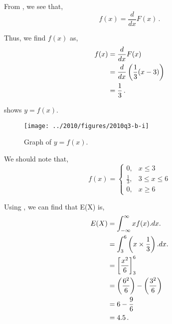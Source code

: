 \begin{subquestions}
\subquestion

\begin{subsubquestions}
	
\subsubquestion

From , we see that,
\begin{equation}
	f(x) = \frac{d}{dx}F(x) \,.
\end{equation}
	
Thus, we find $f(x)$ as,
\begin{align}
	f(x) & = \frac{d}{dx}F(x) \nonumber \\
	     & = \frac{d}{dx}\left(\frac{1}{3}(x-3) \right) \nonumber \\
	     & = \frac{1}{3} \,.
\end{align}

 shows $y=f(x)$.
\begin{figure}[H]
	\begin{center}
		\texttt{[image: ../2010/figures/2010q3-b-i]}
		\caption{\label{2010:q3:fig:fGraph} Graph of $y=f(x)$.}
	\end{center}
\end{figure}

 We should note that,
\[ f(x) =\begin{cases} 
	0, & x \leq 3 \\
	\frac{1}{3}, & 3 \leq x \leq 6 \\
	0, & x \geq 6 
		\end{cases}
\]


\subsubquestion

Using , we can find that E(X) is,
\begin{align}
	E(X) & = \int_{-\infty}^{\infty}x f(x).dx. \nonumber \\
	     & = \int_{3}^{6} \left(x \times \frac{1}{3} \right).dx. \nonumber \\
	     & = \left[\frac{x^2}{6} \right]^{6}_{3} \nonumber \\
	     & = \left( \frac{6^2}{6} \right) - \left( \frac{3^2}{6} \right) \nonumber \\
	     & = 6 - \frac{9}{6} \nonumber \\
	     & = 4.5 \,.
\end{align}



\end{subsubquestions}
\end{subquestions}
